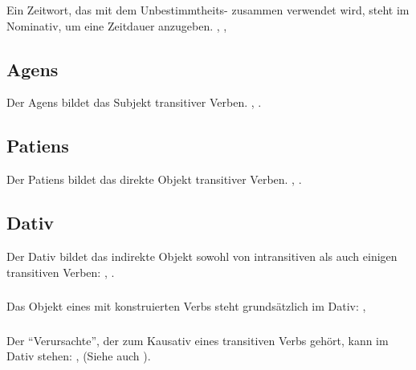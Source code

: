\subsubsection{} Ein Zeitwort, das mit dem Unbestimmtheits- zusammen verwendet
wird, steht im Nominativ, um eine Zeitdauer anzugeben.
, ,
 

\subsection{Agens} Der Agens bildet das Subjekt transitiver Verben.
, .

\subsection{Patiens} Der Patiens bildet das direkte Objekt transitiver Verben.
, .

\subsection{Dativ} Der Dativ bildet das indirekte Objekt sowohl von intransitiven
als auch einigen transitiven Verben: , .

\subsubsection{} Das Objekt eines mit  konstruierten Verbs steht grunds\"atzlich
im Dativ: ,  \label{syn:case:dative-si}

\subsubsection{} Der "`Verursachte"', der zum Kausativ eines transitiven Verbs geh\"ort,
kann im Dativ stehen: ,
 (Siehe auch ).

